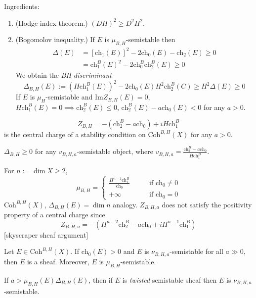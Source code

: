 Ingredients:
\begin{enumerate}
\item (Hodge index theorem.) $(DH)^2 \geq D^2 H^2$.
\item (Bogomolov inequality.) If $E$ is $\mu_{B,H}$-semistable then
\begin{align*}
\Delta(E)&=[\text{ch}_1(E)]^2-2\text{ch}_0(E)-\text{ch}_2(E)\geq 0\\
&=\text{ch}_1^B(E)^2-2\text{ch}_0^B\text{ch}_2^B(E)\geq 0
\end{align*}
We obtain the {\it BH-discriminant} 
$$
\Delta_{B,H}(E):=(H\text{ch}_1^B(E))^2-2\text{ch}_0(E)H^2\text{ch}_2^B(C)
\geq H^2\Delta(E)\geq 0
$$
If $E$ is $\mu_H$-semistable and $\text{Im}Z_{B,H}(E)=0$, $H\text{ch}_1^B(E)=0
\implies \text{ch}_2^B(E)\leq 0$, $\text{ch}_2^B(E)-a\text{ch}_0(E)<0$ 
for any $a>0$.
\end{enumerate}

\begin{theorem}
\label{theorem-Bridgeland-Areni-Bersum}
 $$
Z_{B,H}=-(\text{ch}_2^B-a\text{ch}_0)+iH\text{ch}_1^B
$$
is the central charge of a stability condition on $\text{Coh}^{B,H}(X)$ 
for any $a>0$.
\end{theorem}

\begin{theorem}
\label{theorem-BH-discriminant}
$\Delta_{B,H}\geq 0$ for any $v_{B,H,a}$-semistable object, where 
$v_{B,H,a}=\frac{\text{ch}_2^B-a\text{ch}_0}{H\text{ch}_1^B}$.
\end{theorem}

\medskip\noindent
For $n:=\dim X\geq 2$,
$$
\mu_{B,H}=
\begin{cases}
\frac{H^{n-1}\text{ch}_1^B}{\text{ch}_0}\qquad &\text{if }\text{ch}_0 \neq 0 \\
+\infty\qquad &\text{if }\text{ch}_0=0
\end{cases}
$$
$\text{Coh}^{B,H}(X)$, $\Delta_{B,H}(E)=\dim n$ analogy. $Z_{B,H,a}$ does not
satisfy the positivity property of a central charge since
$$
Z_{B,H,a}=-(H^{n-2}\text{ch}_2^B-a\text{ch}_0+iH^{n-1}\text{ch}_1^B)
$$
[skyscraper sheaf argument]

\begin{exercise}
\label{exercise-E-is-a-sheaf}
Let $E \in \text{Coh}^{B,H}(X)$.
If $\text{ch}_0(E)>0$ and $E$ is $\nu_{B,H,a}$-semistable for all $a\gg 0$, then
$E$ is a sheaf. Moreover, $E$ is $\mu_{B,H}$-semistable.
\end{exercise}

\begin{proposition}[Lo,---]
\label{proposition-}
If $a>\mu_{B,H}(E)\Delta_{B,H}(E)$, then if $E$ is {\it twisted} semistable
sheaf then $E$ is $\nu_{B,H,a}$-semistable.
\end{proposition}

